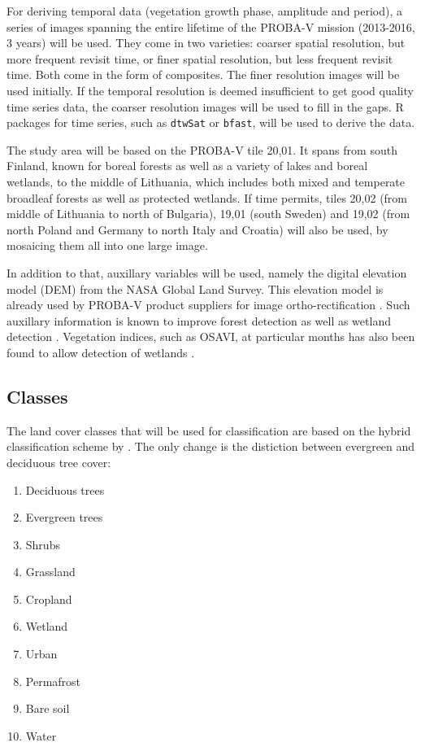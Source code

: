 \documentclass[a4paper,10pt]{article}
\begin{document}
For deriving temporal data (vegetation growth phase, amplitude and period), a series of images spanning the entire lifetime of the PROBA-V mission (2013-2016, 3 years) will be used. They come in two varieties: coarser spatial resolution, but more frequent revisit time, or finer spatial resolution, but less frequent revisit time. Both come in the form of composites. The finer resolution images will be used initially. If the temporal resolution is deemed insufficient to get good quality time series data, the coarser resolution images will be used to fill in the gaps. R packages for time series, such as \texttt{dtwSat} or \texttt{bfast}, will be used to derive the data.

The study area will be based on the PROBA-V tile 20,01. It spans from south Finland, known for boreal forests as well as a variety of lakes and boreal wetlands, to the middle of Lithuania, which includes both mixed and temperate broadleaf forests as well as protected wetlands. If time permits, tiles 20,02 (from middle of Lithuania to north of Bulgaria), 19,01 (south Sweden) and 19,02 (from north Poland and Germany to north Italy and Croatia) will also be used, by mosaicing them all into one large image.

In addition to that, auxillary variables will be used, namely the digital elevation model (DEM) from the NASA Global Land Survey. This elevation model is already used by PROBA-V product suppliers for image ortho-rectification \cite{probavguide}. Such auxillary information is known to improve forest detection as well as wetland detection \cite{sader1995wetlands}. Vegetation indices, such as OSAVI, at particular months has also been found to allow detection of wetlands \cite{davranche2010wetland}.

\subsection{Classes}

The land cover classes that will be used for classification are based on the hybrid classification scheme by \cite{see2015hybrid}. The only change is the distiction between evergreen and deciduous tree cover:
\begin{enumerate}
 \item Deciduous trees
 \item Evergreen trees
 \item Shrubs
 \item Grassland
 \item Cropland
 \item Wetland
 \item Urban
 \item Permafrost
 \item Bare soil
 \item Water
\end{enumerate}
\end{document}
